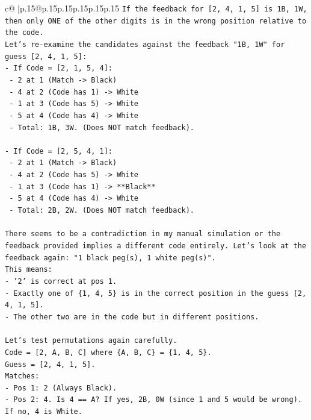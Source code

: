 \documentclass{article}
\begin{document}
{\begin{supertabular}{c@{$\;$}|p{.15\linewidth}@{}p{.15\linewidth}p{.15\linewidth}p{.15\linewidth}p{.15\linewidth}p{.15\linewidth}}
{{{\texttt{If the feedback for {[}2, 4, 1, 5{]} is 1B, 1W, then only ONE of the other digits is in the wrong position relative to the code.} \\
\texttt{Let's re{-}examine the candidates against the feedback "1B, 1W" for guess {[}2, 4, 1, 5{]}:} \\
\texttt{{-} If Code = {[}2, 1, 5, 4{]}:} \\
\texttt{  {-} 2 at 1 (Match {-}> Black)} \\
\texttt{  {-} 4 at 2 (Code has 1) {-}> White} \\
\texttt{  {-} 1 at 3 (Code has 5) {-}> White} \\
\texttt{  {-} 5 at 4 (Code has 4) {-}> White} \\
\texttt{  {-} Total: 1B, 3W. (Does NOT match feedback).} \\
\\ 
\texttt{{-} If Code = {[}2, 5, 4, 1{]}:} \\
\texttt{  {-} 2 at 1 (Match {-}> Black)} \\
\texttt{  {-} 4 at 2 (Code has 5) {-}> White} \\
\texttt{  {-} 1 at 3 (Code has 1) {-}> **Black**} \\
\texttt{  {-} 5 at 4 (Code has 4) {-}> White} \\
\texttt{  {-} Total: 2B, 2W. (Does NOT match feedback).} \\
\\ 
\texttt{There seems to be a contradiction in my manual simulation or the feedback provided implies a different code entirely. Let's look at the feedback again: "1 black peg(s), 1 white peg(s)".} \\
\texttt{This means:} \\
\texttt{{-} '2' is correct at pos 1.} \\
\texttt{{-} Exactly one of \{1, 4, 5\} is in the correct position in the guess {[}2, 4, 1, 5{]}.} \\
\texttt{{-} The other two are in the code but in different positions.} \\
\\ 
\texttt{Let's test permutations again carefully.} \\
\texttt{Code = {[}2, A, B, C{]} where \{A, B, C\} = \{1, 4, 5\}.} \\
\texttt{Guess = {[}2, 4, 1, 5{]}.} \\
\texttt{Matches:} \\
\texttt{{-} Pos 1: 2 (Always Black).} \\
\texttt{{-} Pos 2: 4. Is 4 == A? If yes, 2B, 0W (since 1 and 5 would be wrong). If no, 4 is White.} \\
}}}
\end{supertabular}}
\end{document}
